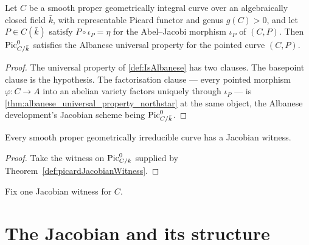 \begin{lemma}
  \label{lem:pic0_isAlbanese_algClosed}
  Let \(C\) be a smooth proper geometrically integral curve over an
  algebraically closed field \(\bar k\), with representable Picard functor and
  genus \(g(C) > 0\), and let \(P \in C(\bar k)\) satisfy
  \(P \circ \iota_P = \eta\) for the Abel--Jacobi morphism \(\iota_P\) of
  \((C, P)\). Then \(\operatorname{Pic}^0_{C/\bar k}\) satisfies the Albanese universal
  property for the pointed curve \((C, P)\).
\end{lemma}

\begin{proof}
  The universal property of \cref{def:IsAlbanese} has two clauses. The basepoint
  clause is the hypothesis. The factorisation clause --- every pointed morphism
  \(\varphi : C \to A\) into an abelian variety factors uniquely through
  \(\iota_P\) --- is \cref{thm:albanese_universal_property_northstar} at the same
  object, the Albanese development's Jacobian scheme being \(\operatorname{Pic}^0_{C/\bar k}\).
\end{proof}

\begin{theorem}
  \label{thm:nonempty_jacobianWitness}
  Every smooth proper geometrically irreducible curve has a Jacobian witness.
\end{theorem}

\begin{proof}
  Take the witness on \(\operatorname{Pic}^0_{C/k}\) supplied by
  Theorem~\ref{def:picardJacobianWitness}.
\end{proof}

\begin{definition}
  \label{def:jacobianWitness}
  Fix one Jacobian witness for \(C\).
\end{definition}

\section{The Jacobian and its structure}

